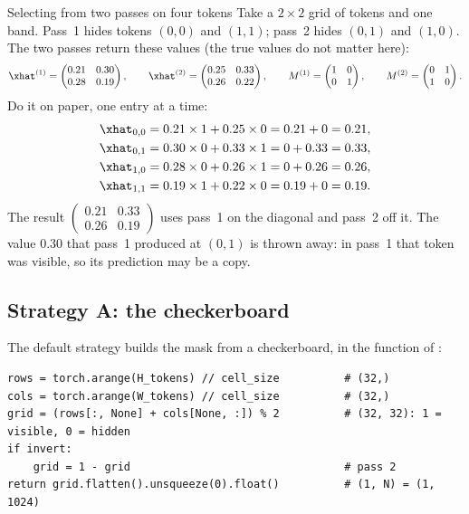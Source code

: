 \begin{worked}[label={we:inference:select}]{Selecting from two passes on four tokens}
Take a $2\times2$ grid of tokens and one band. Pass~1 hides tokens $(0,0)$ and $(1,1)$; pass~2 hides
$(0,1)$ and $(1,0)$. The two passes return these values (the true values do not matter here):
\[
\xhat^{(1)}=\begin{pmatrix}0.21 & 0.30\\ 0.28 & 0.19\end{pmatrix},\qquad
\xhat^{(2)}=\begin{pmatrix}0.25 & 0.33\\ 0.26 & 0.22\end{pmatrix},\qquad
M^{(1)}=\begin{pmatrix}1&0\\0&1\end{pmatrix},\qquad
M^{(2)}=\begin{pmatrix}0&1\\1&0\end{pmatrix}.
\]
Do it on paper, one entry at a time:
\begin{align*}
\xhat_{0,0} &= 0.21\times1 + 0.25\times0 = 0.21 + 0 = 0.21,\\
\xhat_{0,1} &= 0.30\times0 + 0.33\times1 = 0 + 0.33 = 0.33,\\
\xhat_{1,0} &= 0.28\times0 + 0.26\times1 = 0 + 0.26 = 0.26,\\
\xhat_{1,1} &= 0.19\times1 + 0.22\times0 = 0.19 + 0 = 0.19.
\end{align*}
The result $\begin{pmatrix}0.21&0.33\\0.26&0.19\end{pmatrix}$ uses pass~1 on the diagonal and pass~2 off it.
The value $0.30$ that pass~1 produced at $(0,1)$ is thrown away: in pass~1 that token was visible, so its
prediction may be a copy.
\end{worked}

\subsection{Strategy A: the checkerboard}\label{sec:inference:checker}

The default strategy builds the mask from a checkerboard, in the function 
of :
\begin{lstlisting}
rows = torch.arange(H_tokens) // cell_size          # (32,)
cols = torch.arange(W_tokens) // cell_size          # (32,)
grid = (rows[:, None] + cols[None, :]) % 2          # (32, 32): 1 = visible, 0 = hidden
if invert:
    grid = 1 - grid                                 # pass 2
return grid.flatten().unsqueeze(0).float()          # (1, N) = (1, 1024)
\end{lstlisting}


